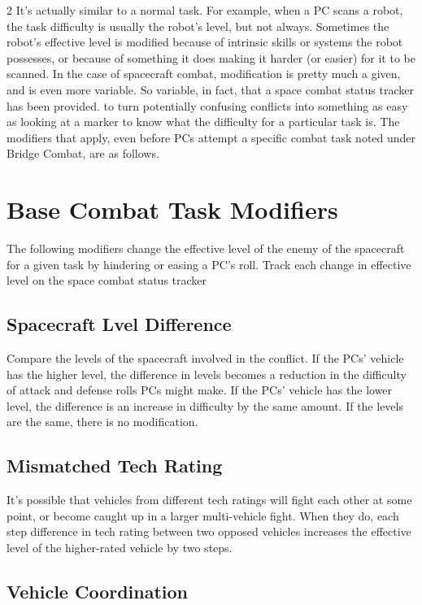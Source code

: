 \begin{multicols}{2}
It’s actually similar to a normal task. For example, when a PC scans a robot, the task difficulty is usually the robot’s level, but not always. Sometimes the robot’s effective level is modified because of intrinsic skills or systems the robot possesses, or because of something it does making it harder (or easier) for it to be scanned. In the case of spacecraft combat, modification is pretty much a given, and is even more variable. So variable, in fact, that a space combat status tracker has been provided. to turn potentially confusing conflicts into something as easy as looking at a marker to know what the difficulty for a particular task is.
The modifiers that apply, even before PCs attempt a specific combat task noted under Bridge Combat, are as follows.

\section{Base Combat Task Modifiers}

The following modifiers change the effective level of the enemy of the spacecraft for a given task by hindering or easing a PC’s roll. Track each change in effective level on the space combat status tracker

\subsection{Spacecraft Lvel Difference}

Compare the levels of the spacecraft involved in the conflict. If the PCs’ vehicle has the higher level, the difference in levels becomes a reduction in the difficulty of attack and defense rolls PCs might make. If the PCs’ vehicle has the lower level, the difference is an increase in difficulty by the same amount. If the levels are the same, there is no modification. 

\subsection{Mismatched Tech Rating}

It’s possible that vehicles from different tech ratings will fight each other at some point, or become caught up in a larger multi-vehicle fight. When they do, each step difference in tech rating between two opposed vehicles increases the effective level of the higher-rated vehicle by two steps.

\subsection{Vehicle Coordination}


\end{multicols}

